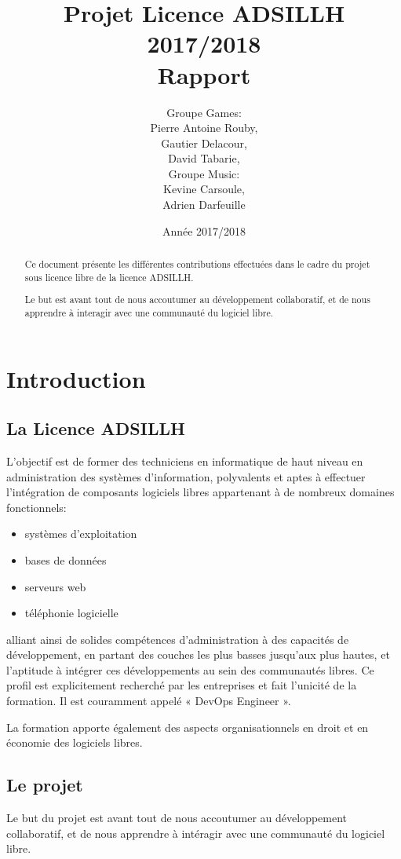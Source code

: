 \documentclass[12pt]{report}
\title{Projet Licence ADSILLH 2017/2018\\Rapport}
\author{Groupe Games:\\ Pierre Antoine Rouby,\\ Gautier Delacour,\\
  \vspace{0.8cm}
  David Tabarie,\\ Groupe Music:\\ Kevine Carsoule,\\ Adrien Darfeuille}
\date{Année 2017/2018}
\begin{document}
\maketitle

\begin{abstract}
Ce document présente les différentes contributions effectuées dans le cadre du projet sous licence libre de la licence ADSILLH.

Le but est avant tout de nous accoutumer au développement
collaboratif, et de nous apprendre à interagir avec une communauté
du logiciel libre.
\end{abstract}

\tableofcontents

\chapter{Introduction}

\section{La Licence ADSILLH}
L'objectif est de former des techniciens en informatique de haut
niveau en administration des systèmes d'information, polyvalents et
aptes à effectuer l'intégration de composants logiciels libres
appartenant à de nombreux domaines fonctionnels:
\begin{itemize}
\item systèmes d'exploitation
\item bases de données
\item serveurs web
\item téléphonie logicielle
\end{itemize}

alliant ainsi de solides compétences d'administration à des capacités
de développement, en partant des couches les plus basses jusqu'aux
plus hautes, et l'aptitude à intégrer ces développements au sein des
communautés libres. Ce profil est explicitement recherché par les
entreprises et fait l'unicité de la formation. Il est couramment
appelé « DevOps Engineer ».

La formation apporte également des aspects organisationnels en droit
et en économie des logiciels libres.

\section{Le projet}
Le but du projet est avant tout de nous accoutumer au développement
collaboratif, et de nous apprendre à intéragir avec une communauté
du logiciel libre.
\end{document}
